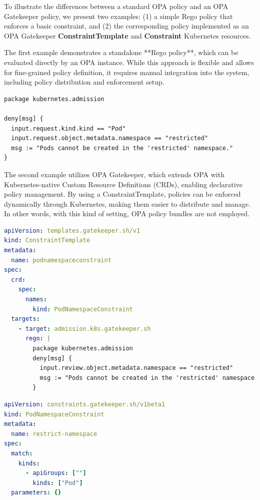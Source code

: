 To illustrate the differences between a standard OPA policy and an OPA Gatekeeper policy, we present two examples:  
(1) a simple Rego policy that enforces a basic constraint, and  
(2) the corresponding policy implemented as an OPA Gatekeeper \textbf{ConstraintTemplate} and \textbf{Constraint} Kubernetes resources.

The first example demonstrates a standalone **Rego policy**, which can be evaluated directly by an OPA instance. While this approach is flexible and allows for fine-grained policy definition, it requires manual integration into the system, including policy distribution and enforcement setup.  

\begin{lstlisting}[language=rego, caption={Simple OPA Rego Policy}, label={lst:opa-rego}]
package kubernetes.admission

deny[msg] {
  input.request.kind.kind == "Pod"
  input.request.object.metadata.namespace == "restricted"
  msg := "Pods cannot be created in the 'restricted' namespace."
}
\end{lstlisting}

The second example utilizes OPA Gatekeeper, which extends OPA with Kubernetes-native Custom Resource Definitions (CRDs), enabling declarative policy management. By using a ConstraintTemplate, policies can be enforced dynamically through Kubernetes, making them easier to distribute and manage.
In other words, with this kind of setting, OPA policy bundles are not employed.

\begin{lstlisting}[language=yaml, caption={OPA Gatekeeper ConstraintTemplate}, label={lst:gatekeeper-template}]
apiVersion: templates.gatekeeper.sh/v1
kind: ConstraintTemplate
metadata:
  name: podnamespaceconstraint
spec:
  crd:
    spec:
      names:
        kind: PodNamespaceConstraint
  targets:
    - target: admission.k8s.gatekeeper.sh
      rego: |
        package kubernetes.admission
        deny[msg] {
          input.review.object.metadata.namespace == "restricted"
          msg := "Pods cannot be created in the 'restricted' namespace."
        }
\end{lstlisting}

\begin{lstlisting}[language=yaml, caption={OPA Gatekeeper Constraint}, label={lst:gatekeeper-constraint}]
apiVersion: constraints.gatekeeper.sh/v1beta1
kind: PodNamespaceConstraint
metadata:
  name: restrict-namespace
spec:
  match:
    kinds:
      - apiGroups: [""]
        kinds: ["Pod"]
  parameters: {}
\end{lstlisting}







